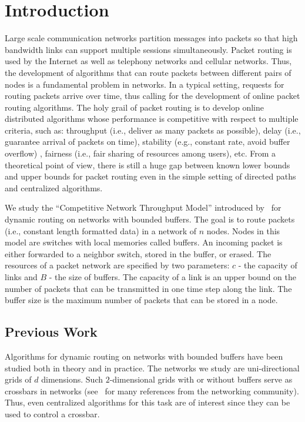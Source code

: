 \documentclass[11pt]{article}
\newenvironment{proof sketch}[1]{\noindent {\emph{Proof sketch of #1:}}}{\hfill \qed}
\begin{document}
\section{Introduction}
Large scale communication networks partition messages into packets so that high
bandwidth links can support multiple sessions simultaneously. Packet routing is used
by the Internet as well as telephony networks and cellular networks. Thus, the
development of algorithms that can route packets between different pairs of nodes is
a fundamental problem in networks. In a typical setting, requests for routing packets
arrive over time, thus calling for the development of online packet routing
algorithms. The holy grail of packet routing is to develop online distributed
algorithms whose performance is competitive with respect to multiple criteria, such
as: throughput (i.e., deliver as many packets as possible), delay (i.e., guarantee
arrival of packets on time), stability (e.g., constant rate, avoid buffer overflow) ,
fairness (i.e., fair sharing of resources among users), etc.  From a theoretical
point of view, there is still a huge gap between known lower bounds and upper bounds
for packet routing even in the simple setting of directed paths and centralized
algorithms.


We study the ``Competitive Network Throughput Model'' introduced by~\cite{AKOR} for
dynamic routing on networks with bounded buffers.  The goal is to route packets
(i.e., constant length formatted data) in a network of $n$ nodes.  Nodes in this
model are switches with local memories called buffers.  An incoming packet is either
forwarded to a neighbor switch, stored in the buffer, or erased. The resources of a
packet network are specified by two parameters: $c$ - the capacity of links and $B$ -
the size of buffers.  The capacity of a link is an upper bound on the number of
packets that can be transmitted in one time step along the link.  The buffer size is
the maximum number of packets that can be stored in a node.


\subsection{Previous Work}
Algorithms for dynamic routing on networks with bounded
buffers have been studied both in theory and in practice.
The networks we study are uni-directional grids of $d$
dimensions. Such $2$-dimensional grids with or without
buffers serve as crossbars in networks
(see~\cite{ARSU,AKRR,T} for many references from the
networking community). Thus, even centralized algorithms
for this task are of interest since they can be used to
control a crossbar.
\end{document}
